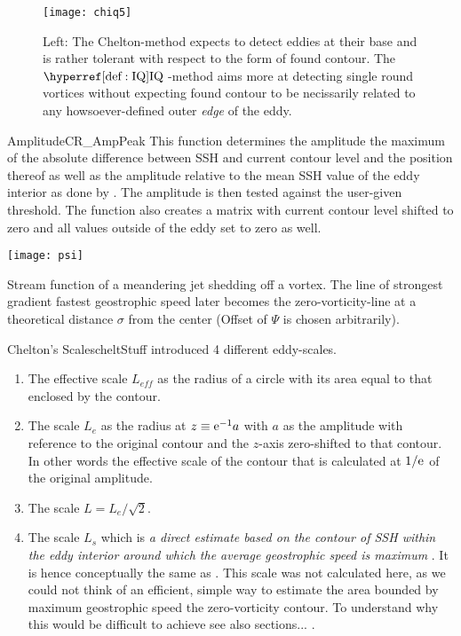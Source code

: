 \begin{figure}
		\texttt{[image: chiq5]}
		\caption{Left: The Chelton-method expects to detect eddies at their base and is rather tolerant with respect to the form of found contour. The $\IQ$-method aims more at detecting single round vortices without expecting found contour to be necissarily related to any howsoever-defined outer \textit{edge} of the eddy.}
		\label{fig:chiq5}
\end{figure}
\begin{filter}{Amplitude}{CR_AmpPeak}
\label{filter:amp}
This function determines the amplitude \ie the maximum of the absolute
difference between SSH and current contour level and the position thereof as
well as the amplitude relative to the mean SSH value of the eddy interior as
done by \citet{Chelton2011}. The
amplitude is then tested against the user-given threshold. The function also
creates a matrix with current contour level shifted to zero and all values
outside of the eddy set to zero as well.
\end{filter}\newline
\begin{marginfigure}
	\texttt{[image: psi]}
	\caption{Stream function of a meandering jet shedding off a vortex. The line of strongest gradient \ie fastest geostrophic speed later becomes the zero-vorticity-line at a theoretical distance $\sigma$ from the center (Offset of $\Psi$ is chosen arbitrarily).}
	\label{fig:psi}
\end{marginfigure}
\begin{filter}{Chelton's Scales}{cheltStuff}
\label{filter:chstuff}
\citet{Chelton2011} introduced 4 different eddy-scales.
\begin{enumerate}
	\item
	The effective scale $L_{eff}$ as the radius of a circle with its area equal to that enclosed by the contour.
	\item
	The scale $L_e$  as  the radius at $z \equiv \mathrm{e}^{-1} a$ with $a$ as the amplitude with reference to the original contour and the $z$-axis zero-shifted to that contour. In other words the effective scale of the contour that is calculated at $1/\mathrm{e}^{}$ of the original amplitude.
	\item
	The scale $L=L_e/\sqrt{2}$.
	\item
	The scale $L_s$ which is \textit{a direct estimate based on the contour of SSH within the eddy interior around which the average geostrophic speed is maximum} \citep{Chelton2011}. It is hence conceptually the same as \scale. This scale was not calculated here, as we could not think of an efficient, simple way to estimate the area bounded by maximum geostrophic speed \ie the zero-vorticity contour. To understand why this would be difficult to achieve see also sections... .
\end{enumerate}
\end{filter}

